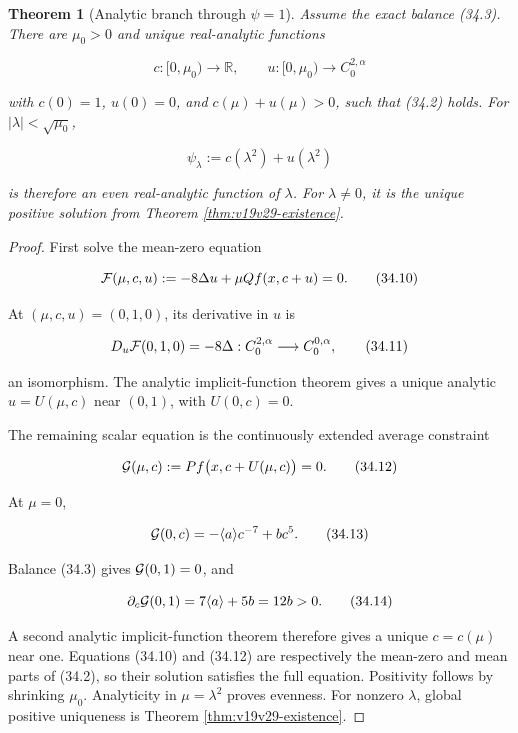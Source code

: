 \documentclass[11pt]{article}
\newtheorem{theorem}{Theorem}[section]
\theoremstyle{remark}
\begin{document}
\begin{theorem}[Analytic branch through \(\psi=1\)]
\label{thm:v19v31-branch}
Assume the exact balance (34.3).  There are \(\mu_0>0\) and unique
real-analytic functions

\[
 c:[0,\mu_0)\to\mathbb R,\qquad
 u:[0,\mu_0)\to C^{2,\alpha}_0                                \tag{34.8}
\]

with \(c(0)=1\), \(u(0)=0\), and \(c(\mu)+u(\mu)>0\), such that
(34.2) holds.  For \(|\lambda|<\sqrt{\mu_0}\),

\[
 \psi_\lambda:=c(\lambda^2)+u(\lambda^2)                     \tag{34.9}
\]

is therefore an even real-analytic function of \(\lambda\).  For
\(\lambda\neq0\), it is the unique positive solution from Theorem
\ref{thm:v19v29-existence}.
\end{theorem}

\begin{proof}
First solve the mean-zero equation

\[
 {\cal F}(\mu,c,u):=-8\Delta u+\mu Qf(x,c+u)=0.                \tag{34.10}
\]

At \((\mu,c,u)=(0,1,0)\), its derivative in \(u\) is

\[
 D_u{\cal F}(0,1,0)=-8\Delta:
 C^{2,\alpha}_0\longrightarrow C^{0,\alpha}_0,                \tag{34.11}
\]

an isomorphism.  The analytic implicit-function theorem gives a unique
analytic \(u=U(\mu,c)\) near \((0,1)\), with \(U(0,c)=0\).

The remaining scalar equation is the continuously extended average
constraint

\[
 {\cal G}(\mu,c):=
 P f\bigl(x,c+U(\mu,c)\bigr)=0.                               \tag{34.12}
\]

At \(\mu=0\),

\[
 {\cal G}(0,c)=-\langle a\rangle c^{-7}+bc^5.                 \tag{34.13}
\]

Balance (34.3) gives
\({\cal G}(0,1)=0\), and

\[
 \partial_c{\cal G}(0,1)
 =7\langle a\rangle+5b=12b>0.                                \tag{34.14}
\]

A second analytic implicit-function theorem therefore gives a unique
\(c=c(\mu)\) near one.  Equations (34.10) and (34.12) are respectively
the mean-zero and mean parts of (34.2), so their solution satisfies the
full equation.  Positivity follows by shrinking \(\mu_0\).  Analyticity
in \(\mu=\lambda^2\) proves evenness.  For nonzero \(\lambda\), global
positive uniqueness is Theorem \ref{thm:v19v29-existence}.
\end{proof}
\end{document}
